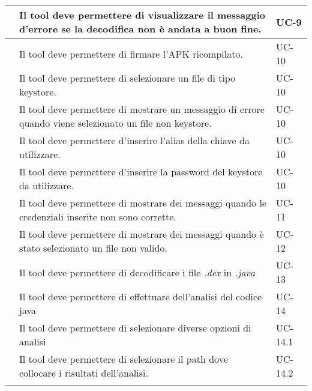 \begin{longtable}{ | c| C{7cm} |C{3cm} |}
           & Il tool deve permettere di visualizzare il messaggio d'errore se la decodifica non è andata a buon fine.              & UC-9           \\\hline

           & Il tool deve permettere di firmare l'APK ricompilato.                                                                 & UC-10          \\\hline
        & Il tool deve permettere di selezionare un file di tipo keystore.                                                      & UC-10          \\\hline
        & Il tool deve permettere di mostrare un messaggio di errore quando viene selezionato un file non keystore.             & UC-10          \\\hline
        & Il tool deve permettere d'inserire l'alias della chiave da utilizzare.                                                & UC-10          \\\hline
        & Il tool deve permettere d'inserire la password del keystore da utilizzare.                                            & UC-10          \\\hline
    \setcounter{subCount}{0}

           & Il tool deve permettere di mostrare dei messaggi quando le credenziali inserite non sono corrette.                    & UC-11          \\\hline
           & Il tool deve permettere di mostrare dei messaggi quando è stato selezionato un file non valido.                       & UC-12          \\\hline
           & Il tool deve permettere di decodificare i file \textit{.dex} in \textit{.java}                                        & UC-13          \\\hline
           & Il tool deve permettere di effettuare dell'analisi del codice java                                      & UC-14          \\\hline
        & Il tool deve permettere di selezionare diverse opzioni di analisi                                                     & UC-14.1        \\\hline
        & Il tool deve permettere di selezionare il path dove collocare i risultati dell'analisi.                               & UC-14.2        \\\hline
    \setcounter{subCount}{0}


\end{longtable}
